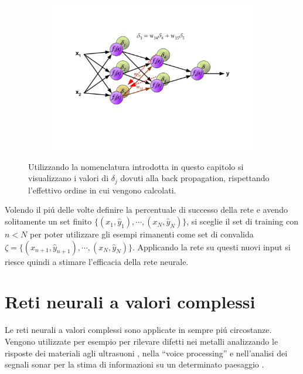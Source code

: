 \documentclass[a4paper,10pt]{article}
\begin{document}
\begin{figure}[h!]
\begin{subfigure}[b]{0.3 \linewidth}
   \includegraphics[width=\linewidth]{BackPropf.png}
  \end{subfigure}
  \caption{Utilizzando la nomenclatura introdotta in questo capitolo si visualizzano i valori di $\delta_j$ dovuti alla back propagation, rispettando l'effettivo ordine in cui vengono calcolati.}
 \end{figure}
 Volendo il pi\'u delle volte definire la percentuale di successo della rete e avendo solitamente un set finito $\{(x_1,\widehat{y}_1), \cdots , (x_N,\widehat{y}_N)\}$, si sceglie il set di training con $n<N$ per poter utilizzare gli esempi rimanenti come set di convalida $\zeta = \{(x_{n+1},\widehat{y}_{n+1}), \cdots , (x_N,\widehat{y}_N)\}$. Applicando la rete su questi nuovi input si riesce quindi a stimare l'efficacia della rete neurale.

 
 \section{Reti neurali a valori complessi}
 Le reti neurali a valori complessi sono applicate in sempre pi\'u circostanze. Vengono utilizzate per esempio per rilevare difetti nei metalli analizzando le risposte dei materiali agli ultrasuoni \cite{birx1993complex}, nella ``voice processing'' \cite{sawada2003polar} e nell'analisi dei segnali sonar per la stima di informazioni su un determinato paesaggio \cite{yamaki2008singular}.
 
 
\end{document}
